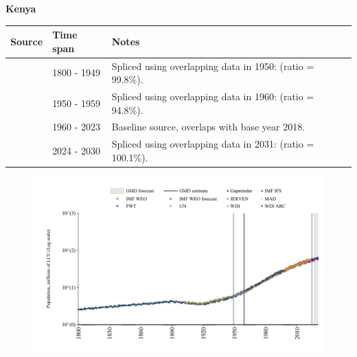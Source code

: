\documentclass[12pt,a4paper,landscape]{article}
\begin{document}
\begin{adjustbox}{max totalsize={\paperwidth}{\paperheight},center}
\begin{minipage}[t][\textheight][t]{\textwidth}
\vspace*{0.5cm}
{}
\begin{center}
{\Large\bfseries Kenya}
\end{center}
\vspace{0.5cm}
\begin{table}[H]
\centering
\small
\begin{tabular}{|l|l|l|}
\hline
\textbf{Source} & \textbf{Time span} & \textbf{Notes} \\
\hline
\rowcolor{white}\cite{Gapminder}& 1800 - 1949 &Spliced using overlapping data in 1950: (ratio = 99.8\%).\\
\rowcolor{lightgray}\cite{IMF_IFS}& 1950 - 1959 &Spliced using overlapping data in 1960: (ratio = 94.8\%).\\
\rowcolor{white}\cite{WDI}& 1960 - 2023 &Baseline source, overlaps with base year 2018.\\
\rowcolor{lightgray}\cite{Gapminder}& 2024 - 2030 &Spliced using overlapping data in 2031: (ratio = 100.1\%).\\
\hline
\end{tabular}
\end{table}
\begin{figure}[H]
\centering
\includegraphics[width=\textwidth,height=0.6\textheight,keepaspectratio]{graphs/KEN_pop.pdf}
\end{figure}
\end{minipage}
\end{adjustbox}
\end{document}
